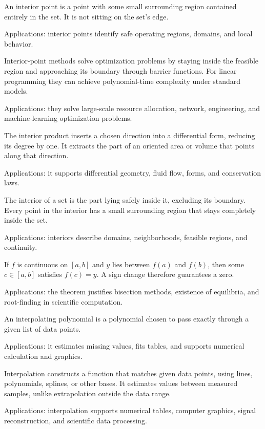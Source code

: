 An interior point is a point with some small surrounding region contained entirely in the set. It is not sitting on the set's edge. \par\noindent Applications: interior points identify safe operating regions, domains, and local behavior.

Interior-point methods solve optimization problems by staying inside the feasible region and approaching its boundary through barrier functions. For linear programming they can achieve polynomial-time complexity under standard models. \par\noindent Applications: they solve large-scale resource allocation, network, engineering, and machine-learning optimization problems.

The interior product inserts a chosen direction into a differential form, reducing its degree by one. It extracts the part of an oriented area or volume that points along that direction. \par\noindent Applications: it supports differential geometry, fluid flow, forms, and conservation laws.

The interior of a set is the part lying safely inside it, excluding its boundary. Every point in the interior has a small surrounding region that stays completely inside the set. \par\noindent Applications: interiors describe domains, neighborhoods, feasible regions, and continuity.

If $f$ is continuous on $[a,b]$ and $y$ lies between $f(a)$ and $f(b)$, then some $c\in[a,b]$ satisfies $f(c)=y$. A sign change therefore guarantees a zero. \par\noindent Applications: the theorem justifies bisection methods, existence of equilibria, and root-finding in scientific computation.

An interpolating polynomial is a polynomial chosen to pass exactly through a given list of data points. \par\noindent Applications: it estimates missing values, fits tables, and supports numerical calculation and graphics.

Interpolation constructs a function that matches given data points, using lines, polynomials, splines, or other bases. It estimates values between measured samples, unlike extrapolation outside the data range. \par\noindent Applications: interpolation supports numerical tables, computer graphics, signal reconstruction, and scientific data processing.

